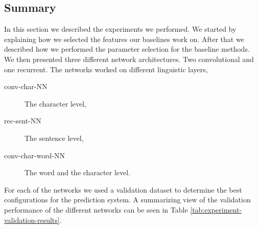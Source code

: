\subsection{Summary}

In this section we described the experiments we performed. We started by
explaining how we selected the features our baselines work on. After that we
described how we performed the parameter selection for the baseline methods. We
then presented three different network architectures. Two convolutional and one
recurrent. The networks worked on different linguistic layers,

\begin{description}
    \item[\gls{conv-char-NN}] The character level,
    \item[\gls{rec-sent-NN}] The sentence level,
    \item[\gls{conv-char-word-NN}] The word and the character level.
\end{description}

For each of the networks we used a validation dataset to determine the best
configurations for the prediction system. A summarizing view of the
validation performance of the different networks can be seen in Table
\ref{tab:experiment-validation-results}.

